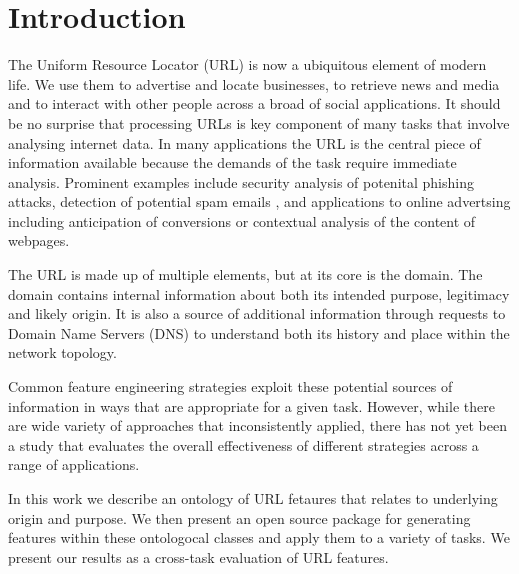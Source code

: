 \documentclass[sigconf]{acmart}
\begin{document}


\maketitle

\section{Introduction}

The Uniform Resource Locator (URL) is now a ubiquitous element of modern life. 
We use them to advertise and locate businesses, to retrieve news and media and 
to interact with other people across a broad of social applications. It should
be no surprise that processing URLs is key component of many tasks that involve
analysing internet data. In many applications the URL is the central piece of 
information available because the demands of the task require immediate analysis.
Prominent examples include security analysis of potenital phishing attacks\cite{Basnet2014}, 
detection of potential spam emails \cite{}, and applications to online advertsing
including anticipation of conversions \cite{Qiu2020} or contextual analysis of
the content of webpages\cite{Kan2005,Baykan2009}. 

The URL is made up of multiple elements, but at its core is the domain. The domain
contains internal information about both its intended purpose, legitimacy and likely
origin. It is also a source of additional information through requests to Domain Name
Servers (DNS) to understand both its history and place within the network topology.

Common feature engineering strategies exploit these potential sources of information
in ways that are appropriate for a given task. However, while there are wide variety
of approaches that inconsistently applied, there has not yet been a study that evaluates
the overall effectiveness of different strategies across a range of applications.

In this work we describe an ontology of URL fetaures that relates to underlying origin
and purpose. We then present an open source package for generating features within these
ontologocal classes and apply them to a variety of tasks. We present our results as a
cross-task evaluation of URL features.  
\end{document}
